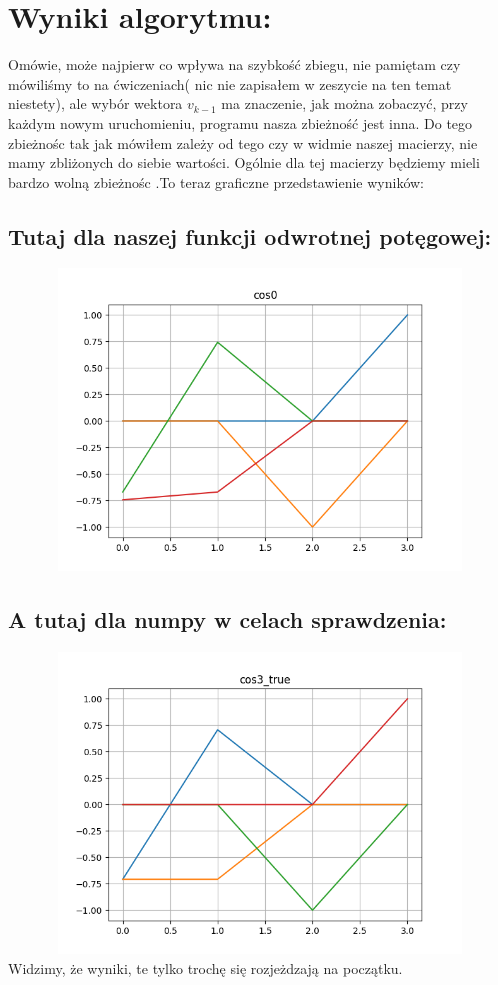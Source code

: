 \documentclass[12pt]{article}
\begin{document}
\section{Wyniki algorytmu: }
Omówie, może najpierw co wpływa na szybkość zbiegu, nie pamiętam czy mówiliśmy to na ćwiczeniach( nic nie zapisałem w zeszycie na ten temat niestety), ale wybór wektora $v_{k-1}$ ma znaczenie, jak można zobaczyć, przy każdym nowym uruchomieniu, programu nasza zbieżność jest inna. Do tego zbieżnośc tak jak mówiłem zależy od tego czy w widmie naszej macierzy, nie mamy zbliżonych do siebie wartości. Ogólnie dla tej macierzy będziemy mieli bardzo wolną zbieżnośc .To teraz graficzne przedstawienie wyników:
\subsection*{Tutaj dla naszej funkcji odwrotnej potęgowej: }
\includegraphics[width=17cm,height=8cm, keepaspectratio]{Wykres_cos0.png}
\subsection*{A tutaj dla numpy w celach sprawdzenia: }
\includegraphics[width=17cm,height=8cm, keepaspectratio]{Wykres_cos3_true.png}
\newline
Widzimy, że wyniki, te tylko trochę się rozjeżdzają na początku.
\end{document}
